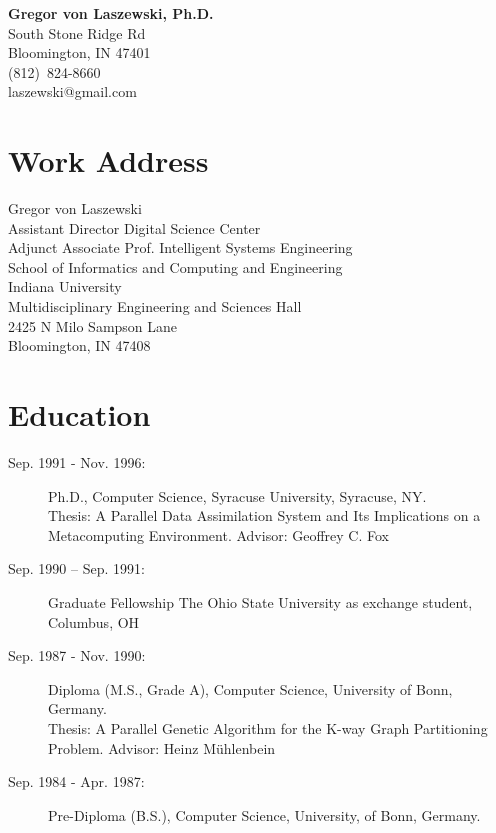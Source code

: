 \documentclass{article}
\begin{document}
\begin{center}
{\huge\bf Gregor von Laszewski, Ph.D.} \\
 South Stone Ridge Rd\\
Bloomington, IN 47401\\
(812)~824-8660\\
laszewski@gmail.com\\
\end{center}


\section{Work Address}

Gregor von Laszewski\\
Assistant Director Digital Science Center\\
Adjunct Associate Prof. Intelligent Systems Engineering\\


School of Informatics and Computing and Engineering\\
Indiana University\\
Multidisciplinary Engineering and Sciences Hall\\
2425 N Milo Sampson Lane\\
Bloomington, IN  47408\\



\section{Education}

\begin{description}
\item[Sep. 1991 - Nov. 1996:]        Ph.D., Computer Science, Syracuse University, Syracuse, NY. \\ 
    			      Thesis: A Parallel Data Assimilation System and Its Implications   
    				on a Metacomputing Environment. Advisor: Geoffrey C. Fox 

\item[Sep. 1990 – Sep. 1991:] 	Graduate Fellowship The Ohio State University as exchange student,
 				Columbus, OH 

\item[Sep. 1987 - Nov. 1990:]   	Diploma (M.S., Grade A), Computer Science, University of Bonn, Germany.\\ 
   				Thesis: A Parallel Genetic Algorithm for the K-way Graph Partitioning   
     				Problem.  Advisor: Heinz Mühlenbein 

\item[Sep. 1984 - Apr. 1987:]   Pre-Diploma (B.S.), Computer Science, University, of Bonn, Germany. 

\end{description}
 
\end{document}
